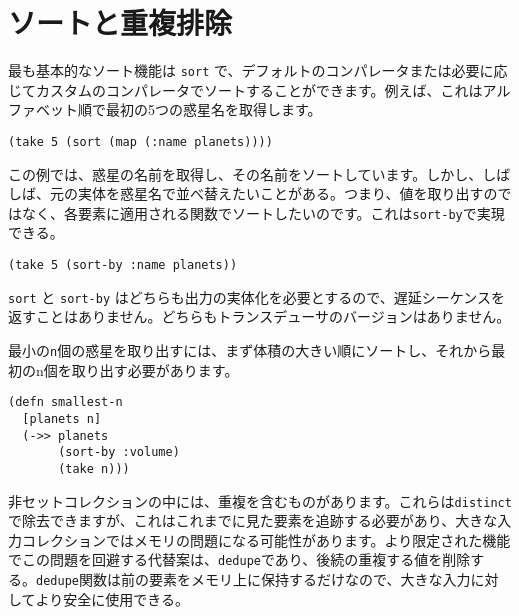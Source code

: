 \section{ソートと重複排除}

最も基本的なソート機能は \texttt{sort} で、デフォルトのコンパレータまたは必要に応じてカスタムのコンパレータでソートすることができます。例えば、これはアルファベット順で最初の5つの惑星名を取得します。


\begin{lstlisting}[numbers=none]
(take 5 (sort (map (:name planets))))
\end{lstlisting}

この例では、惑星の名前を取得し、その名前をソートしています。しかし、しばしば、元の実体を惑星名で並べ替えたいことがある。つまり、値を取り出すのではなく、各要素に適用される関数でソートしたいのです。これは\texttt{sort-by}で実現できる。


\begin{lstlisting}[numbers=none]
(take 5 (sort-by :name planets))
\end{lstlisting}

\texttt{sort} と \texttt{sort-by} はどちらも出力の実体化を必要とするので、遅延シーケンスを返すことはありません。どちらもトランスデューサのバージョンはありません。

最小の\texttt{n}個の惑星を取り出すには、まず体積の大きい順にソートし、それから最初のn個を取り出す必要があります。



\begin{lstlisting}[numbers=none]
(defn smallest-n
  [planets n]
  (->> planets
       (sort-by :volume)
       (take n)))
\end{lstlisting}

非セットコレクションの中には、重複を含むものがあります。これらは\texttt{distinct}で除去できますが、これはこれまでに見た要素を追跡する必要があり、大きな入力コレクションではメモリの問題になる可能性があります。より限定された機能でこの問題を回避する代替案は、\texttt{dedupe}であり、後続の重複する値を削除する。\texttt{dedupe}関数は前の要素をメモリ上に保持するだけなので、大きな入力に対してより安全に使用できる。


